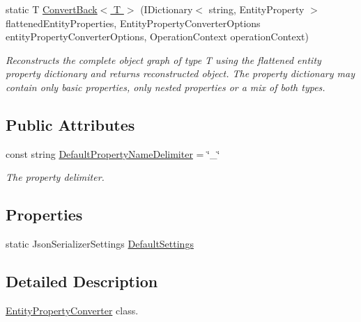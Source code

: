 \begin{DoxyCompactItemize}
static T \hyperlink{classMicrosoft_1_1WindowsAzure_1_1Storage_1_1Table_1_1EntityPropertyConverter_a3beb7c8638a8f6a84bd16c0f0a00521d}{Convert\+Back$<$ T $>$} (I\+Dictionary$<$ string, Entity\+Property $>$ flattened\+Entity\+Properties, Entity\+Property\+Converter\+Options entity\+Property\+Converter\+Options, Operation\+Context operation\+Context)
\begin{DoxyCompactList}\small\item\em Reconstructs the complete object graph of type T using the flattened entity property dictionary and returns reconstructed object. The property dictionary may contain only basic properties, only nested properties or a mix of both types. \end{DoxyCompactList}\end{DoxyCompactItemize}
\subsection*{Public Attributes}
\begin{DoxyCompactItemize}
\item 
const string \hyperlink{classMicrosoft_1_1WindowsAzure_1_1Storage_1_1Table_1_1EntityPropertyConverter_a033985dcd943dd26b2dcb25c93a58193}{Default\+Property\+Name\+Delimiter} = \char`\"{}\+\_\+\char`\"{}
\begin{DoxyCompactList}\small\item\em The property delimiter. \end{DoxyCompactList}\end{DoxyCompactItemize}
\subsection*{Properties}
\begin{DoxyCompactItemize}
\item 
static Json\+Serializer\+Settings \hyperlink{classMicrosoft_1_1WindowsAzure_1_1Storage_1_1Table_1_1EntityPropertyConverter_ae422716e2356233ae6dda2bd9e73f250}{Default\+Settings}
\end{DoxyCompactItemize}


\subsection{Detailed Description}
\hyperlink{classMicrosoft_1_1WindowsAzure_1_1Storage_1_1Table_1_1EntityPropertyConverter}{Entity\+Property\+Converter} class. 



